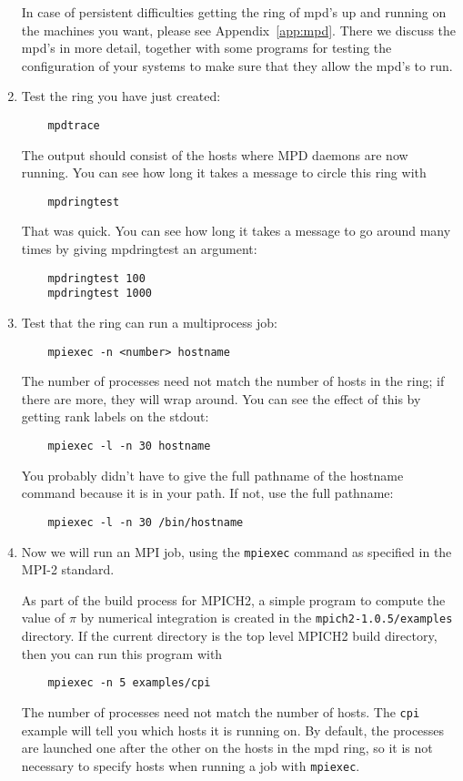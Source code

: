 \documentclass[dvipdfm,11pt]{article}
\begin{document}
\begin{enumerate}
In case of persistent difficulties getting the ring of mpd's up and
running on the machines you want, please see Appendix~\ref{app:mpd}.
There we discuss the mpd's in more detail, together with some programs
for testing the configuration of your systems to make sure that they
allow the mpd's to run.

\item
Test the ring you have just created:
\begin{verbatim}
    mpdtrace
\end{verbatim}
The output should consist of the hosts where MPD daemons are now
running.  You can see how long it takes a message to circle this
ring with 
\begin{verbatim}
    mpdringtest
\end{verbatim}
That was quick.  You can see how long it takes a message to go
around many times by giving mpdringtest an argument:
\begin{verbatim}
    mpdringtest 100
    mpdringtest 1000
\end{verbatim}

\item
Test that the ring can run a multiprocess job:
\begin{verbatim}
    mpiexec -n <number> hostname
\end{verbatim}
The number of processes need not match the number of hosts in the
ring;  if there are more, they will wrap around.  You can see the
effect of this by getting rank labels on the stdout:
\begin{verbatim}
    mpiexec -l -n 30 hostname
\end{verbatim}
You probably didn't have to give the full pathname of the hostname
command because it is in your path.  If not, use the full pathname:
\begin{verbatim}
    mpiexec -l -n 30 /bin/hostname
\end{verbatim}

\item
Now we will run an MPI job, using the \texttt{mpiexec} command as specified
in the MPI-2 standard.  

As part of the build process for MPICH2, a simple program to compute the value
of $\pi$ by numerical integration is created in the
\texttt{mpich2-1.0.5/examples} directory.  If the current directory is the top
level MPICH2 build directory, then you can run this program with
\begin{verbatim}
    mpiexec -n 5 examples/cpi
\end{verbatim}
The number of processes need not match the number of hosts.
The \texttt{cpi} example will tell you which hosts it is running on.
By default, the processes are launched one after the other on the hosts
in the mpd ring, so it is not necessary to specify hosts when running a
job with \texttt{mpiexec}.


\end{enumerate}
\end{document}
